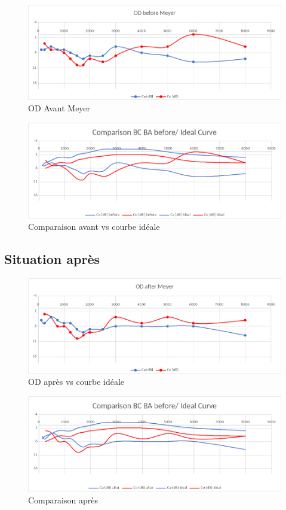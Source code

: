 \begin{enumerate}
 	\lipsum[1]
 	
 	\begin{figure}[tbh]
 		\centering
 		\includegraphics[width=0.7\linewidth]{images/clinique/od_before_meyer.png}
 		\caption{OD Avant Meyer}
 		\label{fig:odbeforemeyer}
 	\end{figure}
 	
 	\lipsum[1]
 	
 	
 	
 	
 	\begin{figure}
 		\centering
 		\includegraphics[width=0.7\linewidth]{images/clinique/comparison_bc_ba_before_vs_ideal_curve_meyer.png}
 		\caption[Avant vs courbe idéale]{Comparaison avant vs courbe idéale}
 		\label{fig:comparisonbcbabeforevsidealcurvemeyer}
 	\end{figure}
 	
 	
 	\subsection{Situation après}
 	\lipsum[1]
 	\begin{figure}[h]
 		\centering
 		\includegraphics[width=0.7\linewidth]{images/clinique/od_after_meyer.png}
 		\caption{OD après vs courbe idéale}
 		\label{fig:odaftermeyer}
 	\end{figure}
 
 \lipsum[1]
 
 \begin{figure}[bh]
 	\centering
 	\includegraphics[width=0.7\linewidth]{images/clinique/comparison_bc_ba_after_vs_ideal_curve_meyer.png}
 	\caption{Comparaison après}
 	\label{fig:comparisonbcbaaftervsidealcurvemeyer}
 \end{figure}
 

\end{enumerate}
